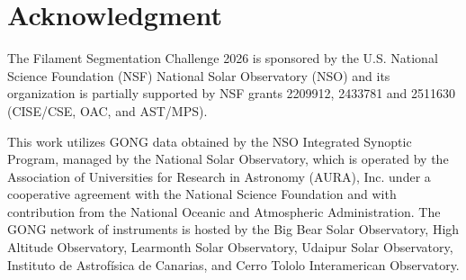 \documentclass[sigconf]{acmart}
\begin{document}
\section{Acknowledgment}\label{sec:acknowledgment}
\begingroup\sloppy
    The Filament Segmentation Challenge 2026 is sponsored by the U.S. National
    Science Foundation (NSF) National Solar Observatory (NSO) and its organization
    is partially supported by NSF grants 2209912, 2433781 and 2511630 (CISE/CSE,
    OAC, and AST/MPS).

    This work utilizes GONG data obtained by the NSO Integrated Synoptic Program,
    managed by the National Solar Observatory, which is operated by the Association
    of Universities for Research in Astronomy (AURA), Inc. under a cooperative
    agreement with the National Science Foundation and with contribution from the
    National Oceanic and Atmospheric Administration. The GONG network of instruments
    is hosted by the Big Bear Solar Observatory, High Altitude Observatory,
    Learmonth Solar Observatory, Udaipur Solar Observatory, Instituto de Astrofísica
    de Canarias, and Cerro Tololo Interamerican Observatory.
\endgroup



\end{document}
